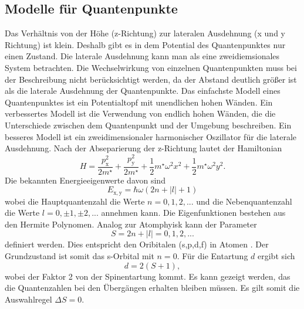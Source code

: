 \subsection{Modelle für Quantenpunkte}
Das Verhältnis von der Höhe (z-Richtung) zur lateralen Ausdehnung  (x und y Richtung) ist klein. Deshalb gibt es in dem Potential des Quantenpunktes nur einen Zustand. Die laterale Ausdehnung kann man als eine zweidiemsionales System betrachten. Die Wechselwirkung von einzelnen Quantenpunkten muss bei der Beschreibung nicht berücksichtigt werden, da der Abstand deutlich grö{\ss}er ist als die laterale Ausdehnung der Quantenpunkte. 
Das einfachste Modell eines Quantenpunktes ist ein Potentialtopf mit unendlichen hohen Wänden. Ein verbessertes Modell ist die Verwendung von endlich hohen Wänden, die die Unterschiede zwischen dem Quantenpunkt und der Umgebung beschreiben. Ein besseres Modell ist ein zweidimensionaler harmonischer Oszillator \cite{Nolting} für die laterale Ausdehnung. Nach der Abseparierung der z-Richtung lautet der Hamiltonian
\begin{equation}  
H = \frac{p_\mathrm{x}^2}{2 m^\star} + \frac{p_\mathrm{y}^2}{2 m^\star} + \frac{1}{2} m^\star \omega^2 x^2 + \frac{1}{2} m^\star \omega^2 y^2. 
\end{equation} 
Die bekannten Energieeigenwerte davon sind 
\begin{equation}
E_{\mathrm{x,y}} = \hbar \omega (2n +|l| +1)
\end{equation}
wobei die Hauptquantenzahl die Werte $n = 0,1,2, ...$ und die Nebenquantenzahl die Werte $l = 0, \pm1, \pm2, ...$ annehmen kann. 
Die Eigenfunktionen bestehen aus den Hermite Polynomen. Analog zur Atomphyisk kann der Parameter 
\begin{equation}
S = 2n +|l| = 0,1,2, ...
\end{equation}
definiert werden. Dies entspricht den Oribitalen (s,p,d,f) in Atomen \cite{Haken_Wolf}. 
Der Grundzustand ist somit das s-Orbital mit $n = 0$. 
Für die Entartung $d$ ergibt sich 
\begin{equation}
d = 2(S+1),
\end{equation}
wobei der Faktor 2 von der Spinentartung kommt. Es kann gezeigt werden, das die Quantenzahlen bei den Übergängen erhalten bleiben müssen.  Es gilt somit die Auswahlregel $\Delta S =0$. 

